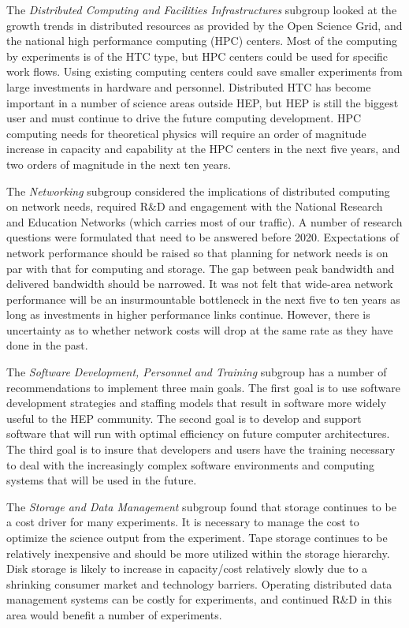The {\it Distributed Computing and Facilities Infrastructures} subgroup
looked at the growth trends in distributed resources as provided by the
Open Science Grid, and the national high performance computing (HPC)
centers. Most of the computing by experiments is of the HTC type, but HPC
centers could be used for specific work flows. Using existing computing
centers could save smaller experiments from large investments in hardware
and personnel. Distributed HTC has become important in a number of science
areas outside HEP, but HEP is still the biggest user and must continue to
drive the future computing development. HPC computing needs for theoretical
physics will require an order of magnitude increase in capacity and
capability at the HPC centers in the next five years, and two orders of
magnitude in the next ten years.

The {\it Networking} subgroup considered the implications of distributed
computing on network needs, required R\&D and engagement with the National
Research and Education Networks (which carries most of our traffic). A
number of research questions were formulated that need to be answered
before 2020. Expectations of network performance should be raised so that
planning for network needs is on par with that for computing and storage.
The gap between peak bandwidth and delivered bandwidth should be narrowed.
It was not felt that wide-area network performance will be an
insurmountable bottleneck in the next five to ten years as long as
investments in higher performance links continue. However, there is
uncertainty as to whether network costs will drop at the same rate as they
have done in the past.

The {\it Software Development, Personnel and Training} subgroup has a
number of recommendations to implement three main goals. The first goal is
to use software development strategies and staffing models that result in
software more widely useful to the HEP community. The second goal is to
develop and support software that will run with optimal efficiency on
future computer architectures. The third goal is to insure that developers
and users have the training necessary to deal with the increasingly complex
software environments and computing systems that will be used in the future.

The {\it Storage and Data Management} subgroup found that storage continues
to be a cost driver for many experiments. It is necessary to manage the
cost to optimize the science output from the experiment. Tape storage
continues to be relatively inexpensive and should be more utilized within
the storage hierarchy. 
Disk storage is likely to increase in capacity/cost relatively slowly due
to a shrinking consumer market and technology barriers.
Operating distributed data management systems can be costly for
experiments, and continued R\&D in this area would benefit a number of 
experiments.

